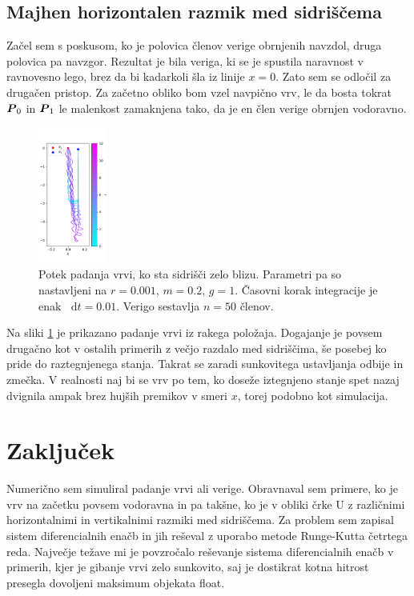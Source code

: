 \documentclass[a4paper, 12pt, slovene]{article}
\newcommand*\diff{\mathop{}\!\mathrm{d}}
\numberwithin{equation}{section}
\newcommand{\bi}[1]{\hbox{\boldmath{$#1$}}}
\begin{document}
\subsection{Majhen horizontalen razmik med sidriščema}
Začel sem s poskusom, ko je polovica členov verige obrnjenih navzdol, druga polovica pa navzgor. Rezultat je bila veriga, ki se je spustila naravnost v ravnovesno lego, brez da bi kadarkoli šla iz linije $x=0$. Zato sem se odločil za drugačen pristop. Za začetno obliko bom vzel navpično vrv, le da bosta tokrat ${\bi P_0}$ in ${\bi P_1}$ le malenkost zamaknjena tako, da je en člen verige obrnjen vodoravno.

\begin{figure}[H]
\centering
\includegraphics[width=0.2\textwidth]{grafi/vertfall_L.6_n.50_k.1_t.12_r.0.001_m.3_g.1_dt.0.01_freq.75.pdf}
\caption{Potek padanja vrvi, ko sta sidrišči zelo blizu. Parametri pa so nastavljeni na $r=0.001$, $m=0.2$, $g=1$. Časovni korak integracije je enak $\diff t = 0.01$. Verigo sestavlja $n=50$ členov.}
\label{f:skupaj}
\end{figure}

Na sliki \ref{f:skupaj} je prikazano padanje vrvi iz rakega položaja. Dogajanje je povsem drugačno kot v ostalih primerih z večjo razdalo med sidriščima, še posebej ko pride do raztegnjenega stanja. Takrat se zaradi sunkovitega ustavljanja odbije in zmečka. V realnosti naj bi se vrv po tem, ko doseže iztegnjeno stanje spet nazaj dvignila ampak brez hujših premikov v smeri $x$, torej podobno kot simulacija.


\section{Zaključek}
Numerično sem simuliral padanje vrvi ali verige. Obravnaval sem primere, ko je vrv na začetku povsem vodoravna in pa takšne, ko je v obliki črke U z različnimi horizontalnimi in vertikalnimi razmiki med sidriščema. Za problem sem zapisal sistem diferencialnih enačb in jih reševal z uporabo metode Runge-Kutta četrtega reda. Največje težave mi je povzročalo reševanje sistema diferencialnih enačb v primerih, kjer je gibanje vrvi zelo sunkovito, saj je dostikrat kotna hitrost presegla dovoljeni maksimum objekata float. \par\vspace{5mm}
\end{document}
